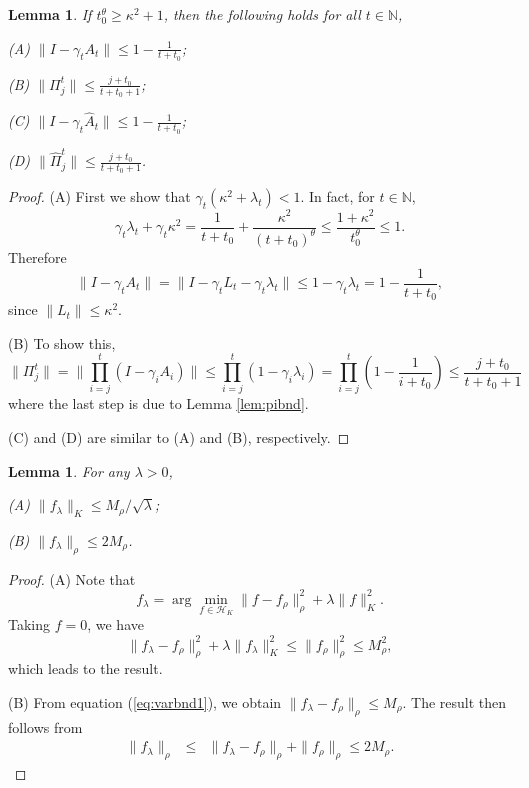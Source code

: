 \documentclass[twoside,11pt]{amsart}
\theoremstyle{theorem}
\newtheorem{lem}[thm]{Lemma}
\theoremstyle{definition}
\theoremstyle{remark}
\newcommand{\DS}{\displaystyle}
\def\A{\hat{A}}
\def\H{{\mathscr H}}
\def\PPi{{\hat{\Pi}}}
\def\N{{\mathbb N}}
\def\t{t_0}
\def\la{\lambda}
\def\ka{\kappa}
\def\ga{\gamma}
\begin{document}
\begin{lem} \label{lem:onebnd} If $\t^\theta \geq \kappa^2+1$, then the following holds for all $t\in \N$,

(A) $\DS \|I - \gamma_t A_t \|\leq 1 - \frac{1}{t+\t}$;

(B) $\DS \|\Pi_j^t\| \leq \frac{j+\t}{t+\t+1} $;

(C) $\DS \|I - \gamma_t \A_t \|\leq 1 - \frac{1}{t+\t}$;

(D) $\DS \|\PPi_j^t\| \leq \frac{j+\t}{t+\t+1} $.
\end{lem}

\begin{proof}
(A) First we show that $\gamma_t (\kappa^2 + \lambda_t)< 1$. In fact, for $t\in \N$,
$$ \gamma_t \lambda_t + \gamma_t \kappa^2 = \frac{1 }{t+\t}+\frac{\kappa^2}{(t+\t)^{\theta}} 
\leq  \frac{1+\kappa^2}{\t^\theta} \leq 1. $$
Therefore
\[ \| I - \ga_t A_t \|= \| I - \ga_t L_t - \ga_t \la_t \| \leq 1-\ga_t \la_t = 1 - \frac{1}{t+\t} , \]
since $\|L_t\|\leq \ka^2$. 

(B) To show this, 
\[  \|\Pi_j^t\| = \| \prod_{i=j}^t (I-\ga_i A_i) \| \leq \prod_{i=j}^t (1-\ga_i \la_i) = \prod_{i=j}^t (1 - \frac{1}{i+\t})\leq \frac{j+\t}{t+\t+1} \]
where the last step is due to Lemma \ref{lem:pibnd}. 

(C) and (D) are similar to (A) and (B), respectively.
\end{proof}


\begin{lem} \label{lem:fla}For any $\lambda>0$,

(A) $\|f_\lambda\|_K \leq M_\rho/\sqrt{\lambda}$;

(B) $\|f_\lambda\|_\rho \leq 2M_\rho$.
\end{lem}

\begin{proof}
(A) Note that
\[ f_\lambda = \arg \min_{f\in \H_K} \|f - f_\rho\|_\rho^2 + \lambda \|f\|^2_K. \]
Taking $f=0$, we have
\begin{equation} \label{eq:varbnd1}
\|f_\lambda - f_\rho\|_\rho^2 + \lambda \|f_\lambda\|^2_K \leq \|f_\rho\|_\rho^2 \leq M_\rho^2,
\end{equation}
which leads to the result.

(B) From equation (\ref{eq:varbnd1}), we obtain $\|f_\lambda - f_\rho\|_\rho \leq M_\rho$. The result then follows from
\begin{eqnarray*}
\|f_\lambda\|_\rho & \leq & \| f_\lambda - f_\rho \|_\rho + \|f_\rho \|_\rho \leq 2M_\rho.
\end{eqnarray*}
\end{proof}
\end{document}
